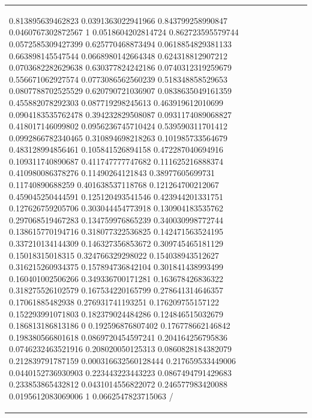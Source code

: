 \documentclass[runningheads]{llncs}\usepackage[]{graphicx}\usepackage[]{color}
\renewcommand{\sparklineheight}{2}
\begin{document}
\begin{table}[ht]
\begin{tabular}{l|p{2.2cm}p{2.2cm}p{2.2cm}p{2.2cm}}
{\begin{sparkline}{10}
\spark 0 0.813895639462823 0.0391363022941966 0.843799258990847 0.0460767302872567 1 0.0518604202814724 0.862723595579744 0.0572585309427399 0.625770468873494 0.0618854829381133 0.663898145547544 0.0668980142664348 0.624318812907212 0.0703682282629638 0.630377824242186 0.0740312319259679 0.556671062927574 0.0773086562560239 0.518348858529653 0.0807788702525529 0.620790721036907 0.0838635049161359 0.455882078292303 0.087719298245613 0.463919612010699 0.0904183535762478 0.394232829508087 0.0931174089068827 0.418017146099802 0.0956236745710424 0.539590311701412 0.0992866782340465 0.310894698218263 0.101985733564679 0.483128994856461 0.105841526894158 0.472287040694916 0.109311740890687 0.411747777747682 0.111625216888374 0.410980086378276 0.11490264121843 0.38977605699731 0.11740890688259 0.401638537118768 0.121264700212067 0.459045250444591 0.125120493541546 0.423944201331751 0.127626759205706 0.303044454773918 0.130904183535762 0.297068519467283 0.134759976865239 0.340030998772744 0.138615770194716 0.318077322536825 0.142471563524195 0.337210134144309 0.146327356853672 0.309745465181129 0.15018315018315 0.324766329298022 0.154038943512627 0.316215260934375 0.157894736842104 0.301841438993499 0.160401002506266 0.349336700171281 0.163678426836322 0.318275526102579 0.167534220165799 0.278641314646357 0.17061885482938 0.276931741193251 0.176209755157122 0.152293991071803 0.182379024484286 0.124846515032679 0.186813186813186 0 0.192596876807402 0.176778662146842 0.198380566801618 0.0869720454597241 0.204164256795836 0.0746232463521916 0.208020050125313 0.0860828184382079 0.212839791787159 0.000316632560128444 0.217659533449006 0.0440152736930903 0.223443223443223 0.0867494791429683 0.233853865432812 0.0431014556822072 0.246577983420088 0.0195612083069006 1 0.0662547823715063 /
\end{sparkline}} & {\renewcommand{\sparklineheight}{3}\definecolor{sparklinecolor}{named}{black}\begin{sparkline}{10}

\end{sparkline}}
\end{tabular}
\end{table}
\end{document}
